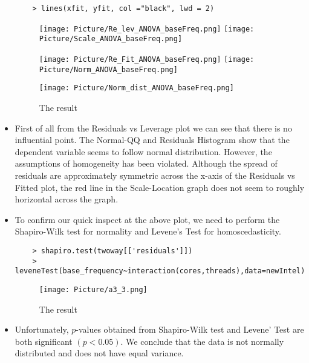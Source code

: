 \documentclass[a4paper]{article}
\begin{document}
\begin{itemize}
\begin{lstlisting}
    > lines(xfit, yfit, col ="black", lwd = 2)
    \end{lstlisting}
    
    \begin{figure}[H]
        \centering
        \texttt{[image: Picture/Re\_lev\_ANOVA\_baseFreq.png]}
        \texttt{[image: Picture/Scale\_ANOVA\_baseFreq.png]}
        \label{7.1.4}
    \end{figure}
    
    \begin{figure}[H]
        \centering
        \texttt{[image: Picture/Re\_Fit\_ANOVA\_baseFreq.png]}
        \texttt{[image: Picture/Norm\_ANOVA\_baseFreq.png]}
        \label{7.1.5}
    \end{figure}
    
    \begin{figure}[H]
        \centering
        \texttt{[image: Picture/Norm\_dist\_ANOVA\_baseFreq.png]}
        \caption{The result}
        \label{7.1.6}
    \end{figure}
    
    \item[] First of all from the Residuals vs Leverage plot we can see that there is no influential point. The Normal-QQ and Residuals Histogram show that the dependent variable seems to follow normal distribution. However, the assumptions of homogeneity has been violated. Although the spread of residuals are approximately symmetric across the x-axis of the Residuals vs Fitted plot, the red line in the Scale-Location graph does not seem to roughly horizontal across the graph.
    
    \item[] To confirm our quick inspect at the above plot, we need to perform the Shapiro-Wilk test for normality and Levene's Test for homoscedasticity.
    \begin{lstlisting}
    > shapiro.test(twoway[['residuals']])
    > leveneTest(base_frequency~interaction(cores,threads),data=newIntel)
    \end{lstlisting}
    
    \begin{figure}[H]
        \centering
        \texttt{[image: Picture/a3\_3.png]}
        \caption{The result}
        \label{7.1.6}
    \end{figure}
    
    \item[] Unfortunately, $p$-values obtained from Shapiro-Wilk test and Levene' Test are both significant $(p<0.05)$. We conclude that the data is not normally distributed and does not have equal variance.
    

\end{itemize}
\end{document}
